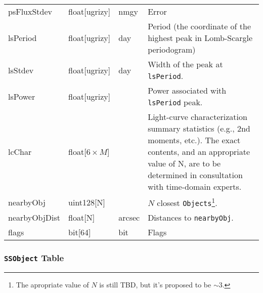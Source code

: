 \documentclass[12pt]{article}
\newcommand{\code}[1]{\texttt{#1}}
\newcommand{\Objects}{\code{Objects}\xspace}
\newcommand{\SSObject}{\code{SSObject}\xspace}
\begin{document}
\begin{center}
\begin{longtable}{p{3cm}p{2cm}p{2cm}p{5cm}}
psFluxStdev & float[ugrizy] & nmgy & Error  \\ 

lsPeriod  & float[ugrizy] & day & Period (the coordinate of the highest peak in Lomb-Scargle periodogram) \\

lsStdev  & float[ugrizy] & day & Width of the peak at \texttt{lsPeriod}. \\

lsPower   & float[ugrizy] & ~ & Power associated with \texttt{lsPeriod} peak. \\

lcChar   & float[$6\times{}M$] & ~ & Light-curve characterization summary statistics (e.g., 2nd moments, etc.). The exact contents, and an appropriate value of N, are to be determined in consultation with time-domain experts. \\

nearbyObj   & uint128[N] & ~ & $N$ closest \Objects\footnote{The apropriate value of $N$ is still TBD, but it's proposed to be $\sim 3$.}. \\

nearbyObjDist   & float[N] & arcsec & Distances to \texttt{nearbyObj}. \\

flags & bit[64] & bit & Flags \\ \hline

\end{longtable}
\end{center}

\subsubsection{\SSObject Table}
\end{document}
